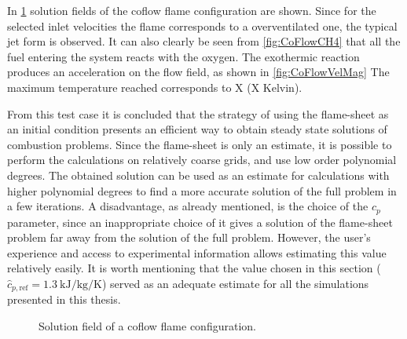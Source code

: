 In \cref{fig:CoFlowFlameFig} solution fields of the coflow flame configuration are shown. Since for the selected inlet velocities the flame corresponds to a overventilated one, the typical jet form is observed. It can also clearly be seen from \cref{fig:CoFlowCH4} that all the fuel entering the system reacts with the oxygen. The exothermic reaction produces an acceleration on the flow field, as shown in  \cref{fig:CoFlowVelMag}
The maximum temperature reached corresponds to X (X Kelvin). %

From this test case it is concluded that the strategy of using the flame-sheet as an initial condition presents an efficient way to obtain steady state solutions of combustion problems. Since the flame-sheet is only an estimate, it is possible to perform the calculations on relatively coarse grids, and use low order polynomial degrees. The obtained solution can be used as an estimate for calculations with higher polynomial degrees to find a more accurate solution of the full problem in a few iterations. A disadvantage, as already mentioned, is the choice of the $c_p$ parameter, since an inappropriate choice of it gives a solution of the flame-sheet problem far away from the solution of the full problem. However, the user's experience and access to experimental information allows estimating this value relatively easily. It is worth mentioning that the value chosen in this section ($\hat{c}_{p,\text{ref}}= \SI{1.3}{\kilo \joule \per \kilo \gram \per \kelvin}$)  served as an adequate estimate for all the simulations presented in this thesis.  


\begin{figure}[t]
	\centering
	\pgfplotsset{width=0.6\textwidth, compat=1.3}
	\par\bigskip
	\caption{Solution field of a coflow flame configuration.} \label{fig:CoFlowFlameFig}
\end{figure}

\FloatBarrier